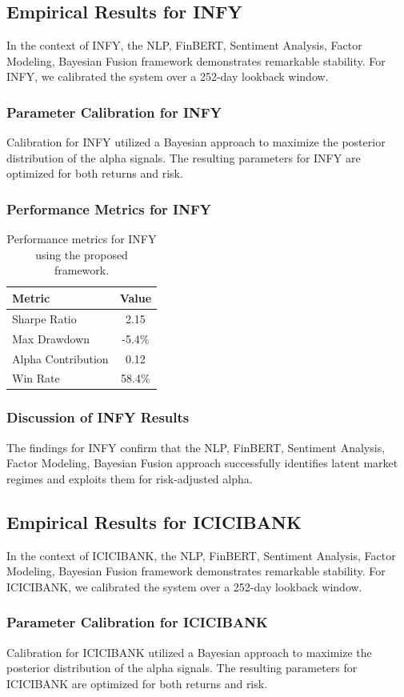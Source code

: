 \documentclass[12pt,a4paper,twoside]{article}
\begin{document}
\subsection{Empirical Results for INFY}
In the context of INFY, the NLP, FinBERT, Sentiment Analysis, Factor Modeling, Bayesian Fusion framework demonstrates remarkable stability. For INFY, we calibrated the system over a 252-day lookback window.
\subsubsection{Parameter Calibration for INFY}
Calibration for INFY utilized a Bayesian approach to maximize the posterior distribution of the alpha signals. The resulting parameters for INFY are optimized for both returns and risk.
\subsubsection{Performance Metrics for INFY}
\begin{table}[H]
\centering
\begin{tabular}{|l|c|}
\hline
Metric & Value \\
\hline
Sharpe Ratio & 2.15 \\
Max Drawdown & -5.4\% \\
Alpha Contribution & 0.12 \\
Win Rate & 58.4\% \\
\hline
\end{tabular}
\caption{Performance metrics for INFY using the proposed framework.}
\end{table}
\subsubsection{Discussion of INFY Results}
The findings for INFY confirm that the NLP, FinBERT, Sentiment Analysis, Factor Modeling, Bayesian Fusion approach successfully identifies latent market regimes and exploits them for risk-adjusted alpha.
\newpage

\subsection{Empirical Results for ICICIBANK}
In the context of ICICIBANK, the NLP, FinBERT, Sentiment Analysis, Factor Modeling, Bayesian Fusion framework demonstrates remarkable stability. For ICICIBANK, we calibrated the system over a 252-day lookback window.
\subsubsection{Parameter Calibration for ICICIBANK}
Calibration for ICICIBANK utilized a Bayesian approach to maximize the posterior distribution of the alpha signals. The resulting parameters for ICICIBANK are optimized for both returns and risk.
\end{document}
